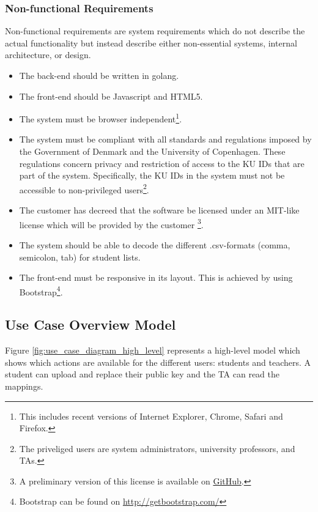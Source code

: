 \documentclass[11pt,a4paper]{report}
\begin{document}
\subsubsection{Non-functional Requirements}\label{subsubsec:Non_Functional_Req}
Non-functional requirements are system requirements which do not describe the actual functionality but instead describe either non-essential systems, internal architecture, or design.
\begin{itemize}
\item The back-end should be written in golang.
\item The front-end should be Javascript and HTML5.
\item The system must be browser independent\footnote{This includes recent versions of Internet Explorer, Chrome, Safari and Firefox.}.
\item The system must be compliant with all standards and regulations imposed by the Government of Denmark and the University of Copenhagen. These regulations concern privacy and restriction of access to the KU IDs that are part of the system. Specifically, the KU IDs in the system must not be accessible to non-privileged users\footnote{The priveliged users are system administrators, university professors, and TAs.}.
\item The customer has decreed that the software be licensed under an MIT-like license which will be provided by the customer
\footnote{A preliminary version of this license is available on \href{https://github.com/oleks/sandstone/blob/master/LICENSE}{GitHub}.}.
\item The system should be able to decode the different .csv-formats (comma, semicolon, tab) for student lists.
\item The front-end must be responsive in its layout. This is achieved by using Bootstrap\footnote{Bootstrap can be found on \href{http://getbootstrap.com/}{http://getbootstrap.com/}}.
\end{itemize}

\subsection{Use Case Overview Model}\label{subsec:Use_case_model}

Figure \ref{fig:use_case_diagram_high_level} represents a high-level model which shows which actions are available for the different users: students and teachers.
A student can upload and replace their public key and the TA can read the mappings.
\end{document}
